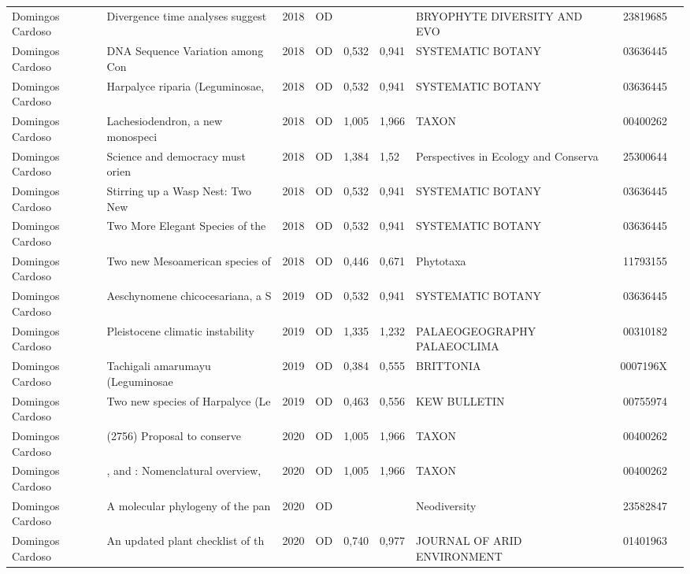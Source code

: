 \documentclass[12pt,brazil]{article}\usepackage[]{graphicx}\usepackage[]{xcolor}
\begin{document}
\begin{longtable}{lllrrllrr}
Domingos Cardoso & Divergence time analyses suggest & 2018 & OD &  &  & BRYOPHYTE DIVERSITY AND EVO & 23819685 \\
Domingos Cardoso & DNA Sequence Variation among Con & 2018 & OD & 0,532 & 0,941 & SYSTEMATIC BOTANY & 03636445 \\
Domingos Cardoso & Harpalyce riparia (Leguminosae,  & 2018 & OD & 0,532 & 0,941 & SYSTEMATIC BOTANY & 03636445 \\
Domingos Cardoso & Lachesiodendron, a new monospeci & 2018 & OD & 1,005 & 1,966 & TAXON & 00400262 \\
Domingos Cardoso & Science and democracy must orien & 2018 & OD & 1,384 & 1,52 & Perspectives in Ecology and Conserva & 25300644 \\
Domingos Cardoso & Stirring up a Wasp Nest: Two New & 2018 & OD & 0,532 & 0,941 & SYSTEMATIC BOTANY & 03636445 \\
Domingos Cardoso & Two More Elegant Species of the  & 2018 & OD & 0,532 & 0,941 & SYSTEMATIC BOTANY & 03636445 \\
Domingos Cardoso & Two new Mesoamerican species of  & 2018 & OD & 0,446 & 0,671 & Phytotaxa & 11793155 \\
Domingos Cardoso & Aeschynomene chicocesariana, a S & 2019 & OD & 0,532 & 0,941 & SYSTEMATIC BOTANY & 03636445 \\
\rowcolor{coautr}\rowcolor{coautr}\rowcolor{coautr}\rowcolor{coautr}\rowcolor{coautr}\rowcolor{coautr}\rowcolor{coautr}\rowcolor{coautr}\rowcolor{coautr}\rowcolor{coautr}\rowcolor{coautr}\rowcolor{coautr}\rowcolor{coautr}\rowcolor{coautr}\rowcolor{coautr}\rowcolor{coautr}Domingos Cardoso & Pleistocene climatic instability & 2019 & OD & 1,335 & 1,232 & PALAEOGEOGRAPHY PALAEOCLIMA & 00310182 \\
Domingos Cardoso & Tachigali amarumayu (Leguminosae & 2019 & OD & 0,384 & 0,555 & BRITTONIA & 0007196X \\
Domingos Cardoso & Two new species of Harpalyce (Le & 2019 & OD & 0,463 & 0,556 & KEW BULLETIN & 00755974 \\
Domingos Cardoso & (2756) Proposal to conserve      & 2020 & OD & 1,005 & 1,966 & TAXON & 00400262 \\
Domingos Cardoso & , and : Nomenclatural overview,  & 2020 & OD & 1,005 & 1,966 & TAXON & 00400262 \\
Domingos Cardoso & A molecular phylogeny of the pan & 2020 & OD &  &  & Neodiversity & 23582847 \\
Domingos Cardoso & An updated plant checklist of th & 2020 & OD & 0,740 & 0,977 & JOURNAL OF ARID ENVIRONMENT & 01401963 \\

\end{longtable}
\end{document}
